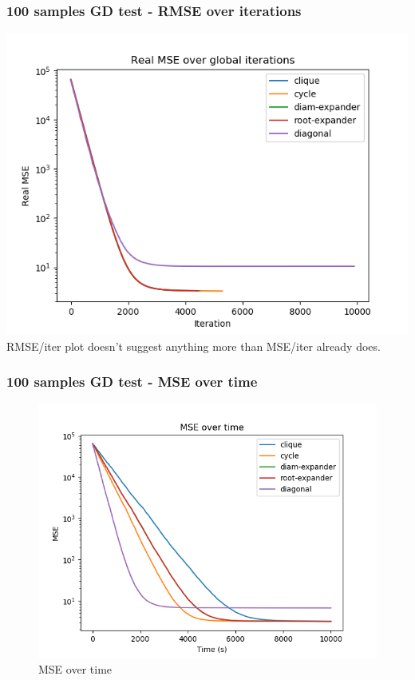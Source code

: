 \documentclass[11pt]{article}
\makeatletter
\def\maxwidth{\ifdim\Gin@nat@width>\linewidth\linewidth
    \else\Gin@nat@width\fi}
\let\Oldincludegraphics\includegraphics
\renewcommand{\includegraphics}[1]{\Oldincludegraphics[width=.8\maxwidth]{#1}}
\makeatother
\begin{document}
    \subsubsection{100 samples GD test - RMSE over
iterations}\label{samples-gd-test---rmse-over-iterations}

\includegraphics{media/img/tests/test_003_100samples_classic/2_real-mse_iter.png}
RMSE/iter plot doesn't suggest anything more than MSE/iter already does.

    \subsubsection{100 samples GD test - MSE over
time}\label{samples-gd-test---mse-over-time}

\begin{figure}
\centering
\includegraphics{media/img/tests/test_003_100samples_classic/3_mse_time.png}
\caption{MSE over time}
\end{figure}
\end{document}
